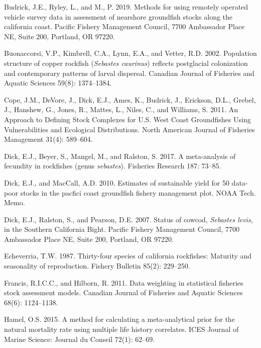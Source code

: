 \documentclass[11pt,
  english,
  letterpaper,
]{article}
\begin{document}
\leavevmode\hypertarget{ref-Budricketal_rov_2019}{}%
Budrick, J.E., Ryley, L., and M., P. 2019. Methods for using remotely operated vehicle survey data in assessment of nearshore groundfish stocks along the california coast. Pacific Fishery Management Council, 7700 Ambassador Place NE, Suite 200, Portland, OR 97220.

\leavevmode\hypertarget{ref-buonaccorsi_population_2002}{}%
Buonaccorsi, V.P., Kimbrell, C.A., Lynn, E.A., and Vetter, R.D. 2002. Population structure of copper rockfish (\emph{Sebastes caurinus}) reflects postglacial colonization and contemporary patterns of larval dispersal. Canadian Journal of Fisheries and Aquatic Sciences 59(8): 1374--1384.

\leavevmode\hypertarget{ref-cope_approach_2011}{}%
Cope, J.M., DeVore, J., Dick, E.J., Ames, K., Budrick, J., Erickson, D.L., Grebel, J., Hanshew, G., Jones, R., Mattes, L., Niles, C., and Williams, S. 2011. An Approach to Defining Stock Complexes for U.S. West Coast Groundfishes Using Vulnerabilities and Ecological Distributions. North American Journal of Fisheries Management 31(4): 589--604.

\leavevmode\hypertarget{ref-dick_meta-analysis_2017}{}%
Dick, E.J., Beyer, S., Mangel, M., and Ralston, S. 2017. A meta-analysis of fecundity in rockfishes (genus \emph{sebastes}). Fisheries Research 187: 73--85.

\leavevmode\hypertarget{ref-DickandMacCall_dbsra_2010}{}%
Dick, E.J., and MacCall, A.D. 2010. Estimates of sustainable yield for 50 data-poor stocks in the pacfici coast groundfish fishery management plot. NOAA Tech. Memo.

\leavevmode\hypertarget{ref-dick_status_2007}{}%
Dick, E.J., Ralston, S., and Pearson, D.E. 2007. Status of cowcod, \emph{Sebastes levis}, in the Southern California Bight. Pacific Fishery Management Council, 7700 Ambassador Place NE, Suite 200, Portland, OR 97220.

\leavevmode\hypertarget{ref-Echeverria_maturity_1987}{}%
Echeverria, T.W. 1987. Thirty-four species of california rockfishes: Maturity and seasonality of reproduction. Fishery Bulletin 85(2): 229--250.

\leavevmode\hypertarget{ref-francis_data_2011}{}%
Francis, R.I.C.C., and Hilborn, R. 2011. Data weighting in statistical fisheries stock assessment models. Canadian Journal of Fisheries and Aquatic Sciences 68(6): 1124--1138.

\leavevmode\hypertarget{ref-hamel_method_2015}{}%
Hamel, O.S. 2015. A method for calculating a meta-analytical prior for the natural mortality rate using multiple life history correlates. ICES Journal of Marine Science: Journal du Conseil 72(1): 62--69.
\end{document}
